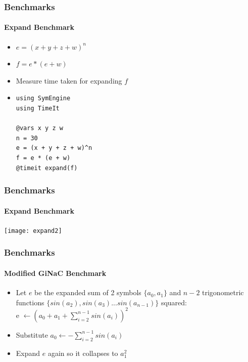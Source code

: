 \documentclass{beamer}
\begin{document}
\begin{frame}[fragile]
\frametitle{Benchmarks}
\framesubtitle{Expand Benchmark}
\begin{itemize}
\item $ e = (x + y + z + w) ^ n $
\item $ f = e * (e + w) $
\item Measure time taken for expanding $f$
\linebreak
\item
\begin{verbatim}
using SymEngine
using TimeIt

@vars x y z w
n = 30
e = (x + y + z + w)^n
f = e * (e + w)
@timeit expand(f)
\end{verbatim}

\end{itemize}
\end{frame}


\begin{frame}
\frametitle{Benchmarks}
\framesubtitle{Expand Benchmark}
\texttt{[image: expand2]}
\end{frame}





\begin{frame}
\frametitle{Benchmarks}
\framesubtitle{Modified GiNaC Benchmark}
\begin{itemize}
\item Let $e$ be the expanded sum of 2 symbols $\{a_0, a_1\}$ and $n-2$ trigonometric functions $\{sin(a_2), sin(a_3)...sin(a_{n-1})\}$ squared:\\
e $\leftarrow (a_0+a_1+\sum_{i=2}^{n-1} sin(a_i))^2$
\item Substitute $a_0 \leftarrow -\sum_{i=2}^{n-1} sin(a_i)$
\item Expand $e$ again so it collapses to $a_1^2$
\end{itemize}
\end{frame}
\end{document}
